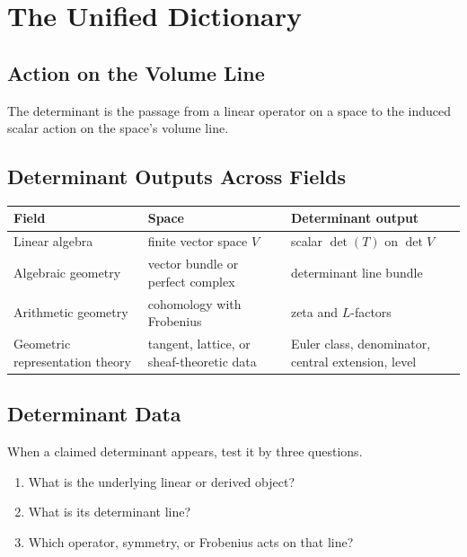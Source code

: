 \documentclass[11pt]{memoir}
\begin{document}
\chapter{The Unified Dictionary}
\label{ch:unified}

\section{Action on the Volume Line}
\label{sec:one-sentence}

The determinant is the passage from a linear operator on a space to
the induced scalar action on the space's volume line.

\section{Determinant Outputs Across Fields}
\label{sec:four-realizations}

\begin{center}
\begin{tabular}{p{}p{}p{}}
\textbf{Field} & \textbf{Space} & \textbf{Determinant output}\\
\hline
Linear algebra & finite vector space \(V\) & scalar \(\det(T)\) on \(\det V\)\\
Algebraic geometry & vector bundle or perfect complex & determinant line bundle\\
Arithmetic geometry & cohomology with Frobenius & zeta and \(L\)-factors\\
Geometric representation theory & tangent, lattice, or sheaf-theoretic data & Euler class, denominator, central extension, level\\
\end{tabular}
\end{center}

\section{Determinant Data}
\label{sec:three-tests}

When a claimed determinant appears, test it by three questions.

\begin{enumerate}
\item What is the underlying linear or derived object?
\item What is its determinant line?
\item Which operator, symmetry, or Frobenius acts on that line?
\end{enumerate}
\end{document}
